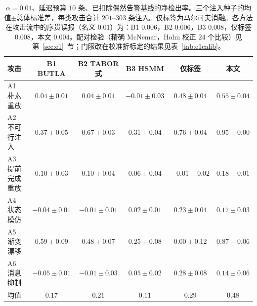\documentclass[manuscript,screen,review]{acmart}
\begin{document}
\begin{table}[!t]
\renewcommand{\arraystretch}{1.15}
\caption{$\alpha=0.01$、延迟预算 $10$ 条、已扣除偶然告警基线的净检出率。三个注入种子的均值$\pm$总体标准差，每类攻击合计 $201$--$303$ 条注入。仅标签为马尔可夫消融。各方法在攻击流中的序贯误报（名义 $0.01$）为：{B1} $0.006$，{B2} $0.006$，{B3} $0.008$，仅标签 $0.008$，本文 $0.004$。配对检验（精确 {McNemar}，{Holm} 校正 $24$ 个比较）见第~\ref{sec:e1}~节；门限改在校准折标定的结果见表~\ref{tab:e1calib}。}
\label{tab:e1}
\centering
\scriptsize
\begin{tabular}{lccccc}
\toprule
攻击 & {B1} {BUTLA} & {B2} {TABOR} 式 & {B3} {HSMM} & 仅标签 & 本文 \\
\midrule
{A1} 朴素重放 & $0.04{\pm}0.01$ & $0.04{\pm}0.01$ & $-0.01{\pm}0.03$ & $0.48{\pm}0.04$ & $0.55{\pm}0.04$ \\
{A2} 不可行注入 & $0.37{\pm}0.05$ & $0.67{\pm}0.03$ & $0.31{\pm}0.04$ & $0.76{\pm}0.04$ & $0.95{\pm}0.00$ \\
{A3} 提前完成重放 & $0.10{\pm}0.03$ & $0.10{\pm}0.04$ & $0.06{\pm}0.04$ & $-0.01{\pm}0.02$ & $0.18{\pm}0.01$ \\
{A4} 状态模仿 & $-0.04{\pm}0.01$ & $-0.01{\pm}0.01$ & $0.02{\pm}0.01$ & $0.23{\pm}0.04$ & $0.17{\pm}0.03$ \\
{A5} 渐变漂移 & $0.59{\pm}0.09$ & $0.48{\pm}0.07$ & $0.25{\pm}0.08$ & $0.00{\pm}0.12$ & $0.87{\pm}0.06$ \\
{A6} 消息抑制 & $-0.05{\pm}0.01$ & $-0.01{\pm}0.03$ & $0.05{\pm}0.02$ & $0.28{\pm}0.08$ & $0.14{\pm}0.06$ \\
\midrule
均值 & $0.17$ & $0.21$ & $0.11$ & $0.29$ & $0.48$ \\
\bottomrule
\end{tabular}
\end{table}
\end{document}
